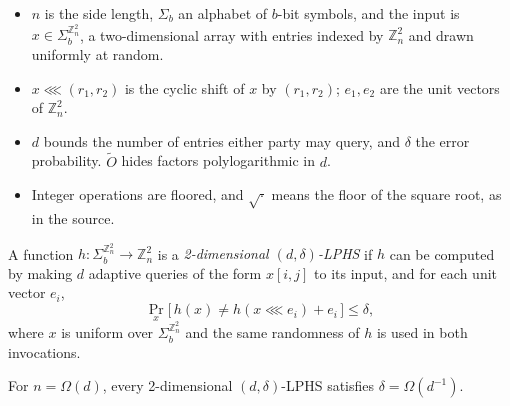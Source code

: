 \documentclass{conjura-conjecture}
\newcommand{\Z}{\mathbb{Z}}
\newcommand{\Ot}{\widetilde{O}}
\newcommand{\Om}{\Omega}
\newcommand{\shift}{\lll}
\begin{document}
\begin{itemize}[nosep]
  \item $n$ is the side length, $\Sigma_{b}$ an alphabet of $b$-bit
    symbols, and the input is $x \in \Sigma_{b}^{\Z_{n}^{2}}$, a
    two-dimensional array with entries indexed by $\Z_{n}^{2}$ and
    drawn uniformly at random.
  \item $x \shift (r_{1}, r_{2})$ is the cyclic shift of $x$ by
    $(r_{1}, r_{2})$; $e_{1}, e_{2}$ are the unit vectors of
    $\Z_{n}^{2}$.
  \item $d$ bounds the number of entries either party may query, and
    $\delta$ the error probability. $\Ot$ hides factors polylogarithmic
    in $d$.
  \item Integer operations are floored, and $\sqrt{\cdot}$ means the
    floor of the square root, as in the source.
\end{itemize}

\begin{definition}\label{def:lphs}
A function $h : \Sigma_{b}^{\Z_{n}^{2}} \to \Z_{n}^{2}$ is a
\emph{2-dimensional $(d, \delta)$-LPHS} if $h$ can be computed by making
$d$ adaptive queries of the form $x[i,j]$ to its input, and for each
unit vector $e_{i}$,
\[
  \Pr_{x}\bigl[\, h(x) \ne h(x \shift e_{i}) + e_{i} \,\bigr]
  \le \delta,
\]
where $x$ is uniform over $\Sigma_{b}^{\Z_{n}^{2}}$ and the same
randomness of $h$ is used in both invocations.
\end{definition}

\begin{theorem}[The source's Theorem 1.4, at $k = 2$]\label{thm:lower}
For $n = \Om(d)$, every 2-dimensional $(d, \delta)$-LPHS satisfies
$\delta = \Om(d^{-1})$.
\end{theorem}
\end{document}
